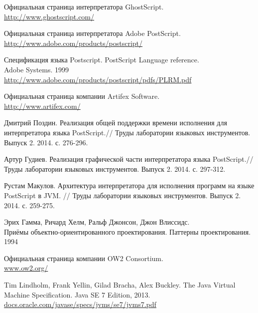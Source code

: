 	\begin{thebibliography}{99}
		Официальная страница интерпретатора GhostScript. \\
		\url{http://www.ghostscript.com/}
		
		Официальная страница интерпретатора Adobe PostScript. \\
		\url{http://www.adobe.com/products/postscript/}
		
		Спецификация языка Postscript. PostScript Language reference. \\
		Adobe Systems. 1999\\
		\url{http://www.adobe.com/products/postscript/pdfs/PLRM.pdf}
		
		Официальная страница компании Artifex Software. \\
		\url{	http://www.artifex.com/}

		Дмитрий Поздин. Реализация общей поддержки времени исполнения для интерпретатора языка PostScript.// Труды лаборатории языковых инструментов. Выпуск 2. 2014. с. 276-296.
		
		Артур Гудиев.
		Реализация графической части интерпретатора языка PostScript.// Труды лаборатории языковых инструментов. Выпуск 2. 2014. с. 297-312.

		Рустам Макулов.
		Архитектура интерпретатора для исполнения программ на языке PostScript в JVM. // Труды лаборатории языковых инструментов. Выпуск 2. 2014. с. 259-275.
		
		
		Эрих Гамма, Ричард Хелм, Ральф Джонсон, Джон Влиссидс. \\ Приёмы объектно-ориентированного проектирования. Паттерны проектирования.  1994

		Официальная страница компании OW2 Consortium. \\
		\url{www.ow2.org/}
				
		Tim Lindholm, Frank Yellin, Gilad Bracha, Alex Buckley.
		The Java Virtual Machine Specification.
		Java SE 7 Edition, 2013. \\
		\url{docs.oracle.com/javase/specs/jvms/se7/jvms7.pdf}
	\end{thebibliography}
